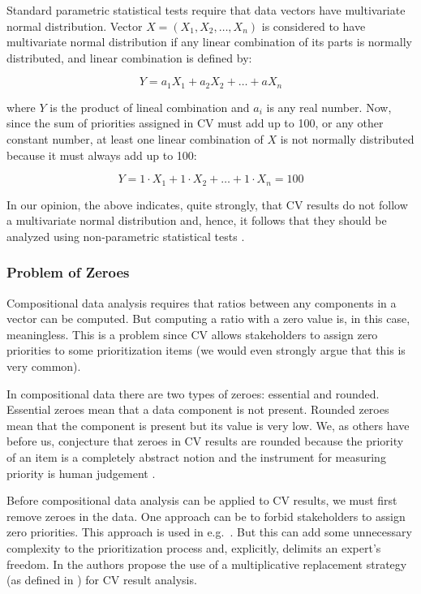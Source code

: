 Standard parametric statistical tests require that data vectors have
multivariate normal distribution. Vector $X=(X_{1}, X_{2}, \ldots, X_{n})$
is considered to have multivariate normal distribution if any linear
combination of its parts is normally distributed, and linear combination
is defined by:

\begin{equation}
	Y=a_{1}X_{1}+a_{2}X_{2}+\ldots+aX_{n}
\end{equation}

where $Y$ is the product of lineal combination and $a_{i}$ is any
real number. Now, since the sum of priorities assigned in CV must add up
to 100, or any other constant number, at least one linear combination
of $X$ is not normally distributed because it must always add up to
100:

\begin{equation}
	Y=1\cdot X_{1}+1\cdot X_{2}+\ldots+1\cdot X_{n}=100
\end{equation}

In our opinion, the above indicates, quite strongly, that CV results do not follow a multivariate normal distribution and, hence, it follows that they should be analyzed using non-parametric statistical tests \cite{Pawlowsky-Glahn2006}.

\subsubsection{\label{Problem-of-Zeroes}Problem of Zeroes}
Compositional data analysis requires that ratios between any components in a vector can be
computed. But computing a ratio with a zero value is, in this case, meaningless. This is
a problem since CV allows stakeholders to assign zero priorities
to some prioritization items (we would even strongly argue that this is very common). 

In compositional data there are two types of zeroes: essential and rounded.
Essential zeroes mean that a data component
is not present. Rounded zeroes mean that the component is present but
its value is very low. We, as others have before us, conjecture that zeroes in CV results are 
rounded because the priority of an item is a completely abstract notion
and the instrument for measuring priority is human judgement \cite{Chatzipetrou2010}.

Before compositional data analysis can be applied to CV results, we must first remove
zeroes in the data. One approach can be to forbid stakeholders
to assign zero priorities. This approach is used in e.g.\ \cite{Pettersson2008}.
But this can add some unnecessary complexity to the prioritization
process and, explicitly, delimits an expert's freedom. 
In \cite{Chatzipetrou2010} the authors propose the use of a multiplicative 
replacement strategy (as defined in \cite{Martin-Fernandez2003}) for CV result analysis.

